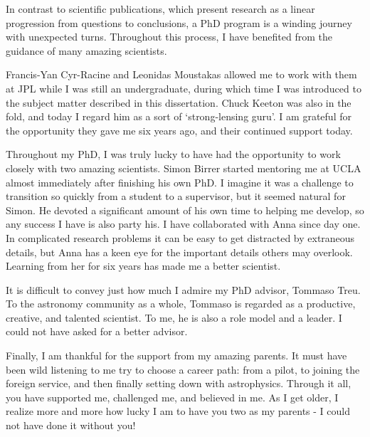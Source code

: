 {\indent In contrast to scientific publications, which present research as a linear progression from questions to conclusions, a PhD program is a winding journey with unexpected turns. Throughout this process, I have benefited from the guidance of many amazing scientists. 
	
Francis-Yan Cyr-Racine and Leonidas Moustakas allowed me to work with them at JPL while I was still an undergraduate, during which time I was introduced to the subject matter described in this dissertation. Chuck Keeton was also in the fold, and today I regard him as a sort of `strong-lensing guru'. I am grateful for the opportunity they gave me six years ago, and their continued support today. 

Throughout my PhD, I was truly lucky to have had the opportunity to work closely with two amazing scientists. Simon Birrer started mentoring me at UCLA almost immediately after finishing his own PhD. I imagine it was a challenge to transition so quickly from a student to a supervisor, but it seemed natural for Simon. He devoted a significant amount of his own time to helping me develop, so any success I have is also party his. I have collaborated with Anna since day one. In complicated research problems it can be easy to get distracted by extraneous details, but Anna has a keen eye for the important details others may overlook. Learning from her for six years has made me a better scientist. 

It is difficult to convey just how much I admire my PhD advisor, Tommaso Treu. To the astronomy community as a whole, Tommaso is regarded as a productive, creative, and talented scientist. To me, he is also a role model and a leader. I could not have asked for a better advisor.  

Finally, I am thankful for the support from my amazing parents. It must have been wild listening to me try to choose a career path: from a pilot, to joining the foreign service, and then finally setting down with astrophysics. Through it all, you have supported me, challenged me, and believed in me. As I get older, I realize more and more how lucky I am to have you two as my parents - I could not have done it without you! 
}